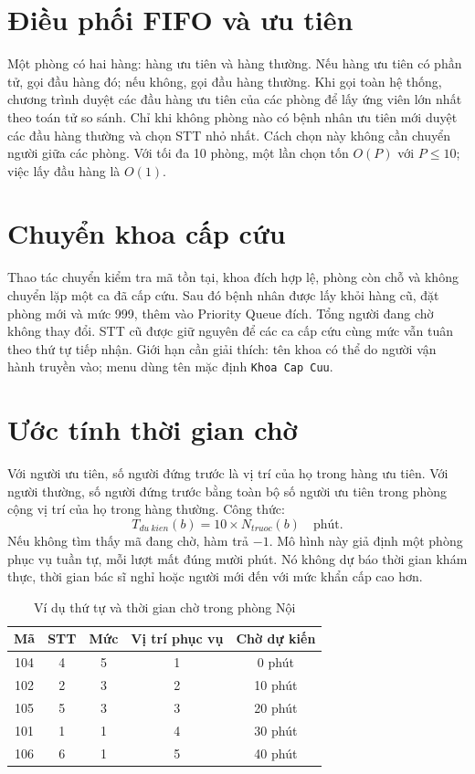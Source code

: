 \documentclass[12pt,a4paper,oneside]{report}
\begin{document}
\section{Điều phối FIFO và ưu tiên}
Một phòng có hai hàng: hàng ưu tiên và hàng thường. Nếu hàng ưu tiên có phần tử, gọi đầu hàng đó; nếu không, gọi đầu hàng thường. Khi gọi toàn hệ thống, chương trình duyệt các đầu hàng ưu tiên của các phòng để lấy ứng viên lớn nhất theo toán tử so sánh. Chỉ khi không phòng nào có bệnh nhân ưu tiên mới duyệt các đầu hàng thường và chọn STT nhỏ nhất. Cách chọn này không cần chuyển người giữa các phòng. Với tối đa 10 phòng, một lần chọn tốn $O(P)$ với $P\leq10$; việc lấy đầu hàng là $O(1)$.

\section{Chuyển khoa cấp cứu}
Thao tác chuyển kiểm tra mã tồn tại, khoa đích hợp lệ, phòng còn chỗ và không chuyển lặp một ca đã cấp cứu. Sau đó bệnh nhân được lấy khỏi hàng cũ, đặt phòng mới và mức 999, thêm vào Priority Queue đích. Tổng người đang chờ không thay đổi. STT cũ được giữ nguyên để các ca cấp cứu cùng mức vẫn tuân theo thứ tự tiếp nhận. Giới hạn cần giải thích: tên khoa có thể do người vận hành truyền vào; menu dùng tên mặc định \texttt{Khoa Cap Cuu}.

\section{Ước tính thời gian chờ}
Với người ưu tiên, số người đứng trước là vị trí của họ trong hàng ưu tiên. Với người thường, số người đứng trước bằng toàn bộ số người ưu tiên trong phòng cộng vị trí của họ trong hàng thường. Công thức:
\begin{equation}
T_{du\ kien}(b)=10\times N_{truoc}(b)\quad \text{phút}.
\end{equation}
Nếu không tìm thấy mã đang chờ, hàm trả $-1$. Mô hình này giả định một phòng phục vụ tuần tự, mỗi lượt mất đúng mười phút. Nó không dự báo thời gian khám thực, thời gian bác sĩ nghỉ hoặc người mới đến với mức khẩn cấp cao hơn.

\begin{table}[H]\centering\caption{Ví dụ thứ tự và thời gian chờ trong phòng Nội}
\begin{tabular}{ccccc}\toprule
Mã & STT & Mức & Vị trí phục vụ & Chờ dự kiến\\\midrule
104 & 4 & 5 & 1 & 0 phút\\
102 & 2 & 3 & 2 & 10 phút\\
105 & 5 & 3 & 3 & 20 phút\\
101 & 1 & 1 & 4 & 30 phút\\
106 & 6 & 1 & 5 & 40 phút\\\bottomrule
\end{tabular}
\end{table}
\end{document}

